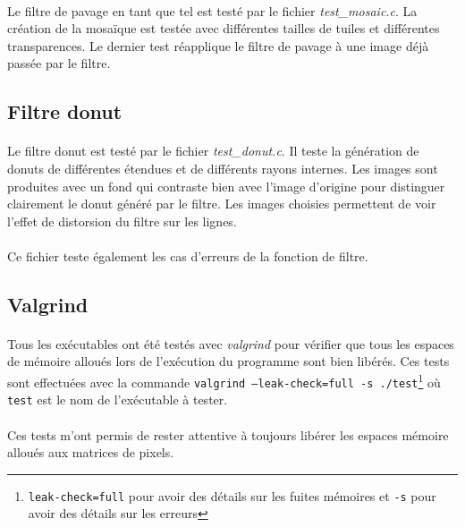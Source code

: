 \documentclass{article}
\begin{document}
    \paragraph{}
    Le filtre de pavage en tant que tel est testé par le fichier \emph{test\_mosaic.c}. La création de la mosaïque est testée avec différentes tailles de tuiles et différentes transparences. Le dernier test réapplique le filtre de pavage à une image déjà passée par le filtre.


    \subsection{Filtre donut}
    \paragraph{}
    Le filtre donut est testé par le fichier \emph{test\_donut.c}. Il teste la génération de donuts de différentes étendues et de différents rayons internes. Les images sont produites avec un fond qui contraste bien avec l'image d'origine pour distinguer clairement le donut généré par le filtre. Les images choisies permettent de voir l'effet de distorsion du filtre sur les lignes.

    \paragraph{}
    Ce fichier teste également les cas d'erreurs de la fonction de filtre.



    \subsection{Valgrind}
    \paragraph{}
    Tous les exécutables ont été testés avec \emph{valgrind} pour vérifier que tous les espaces de mémoire alloués lors de l'exécution du programme sont bien libérés. Ces tests sont effectuées avec la commande \texttt{valgrind --leak-check=full -s ./test}\footnote{\texttt{leak-check=full} pour avoir des détails sur les fuites mémoires et \texttt{-s} pour avoir des détails sur les erreurs} où \texttt{test} est le nom de l'exécutable à tester.

    \paragraph{}
    Ces tests m'ont permis de rester attentive à toujours libérer les espaces mémoire alloués aux matrices de pixels.
\end{document}
